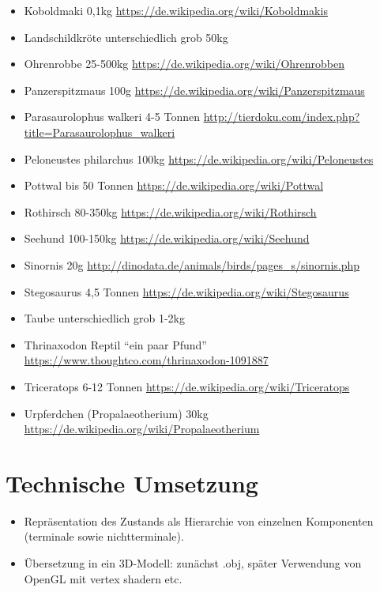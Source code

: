 \begin{itemize}
  \item Koboldmaki 0,1kg \url{https://de.wikipedia.org/wiki/Koboldmakis}
  \item Landschildkröte unterschiedlich grob 50kg
  \item Ohrenrobbe 25-500kg \url{https://de.wikipedia.org/wiki/Ohrenrobben}
  \item Panzerspitzmaus 100g \url{https://de.wikipedia.org/wiki/Panzerspitzmaus}
  \item Parasaurolophus walkeri 4-5 Tonnen \url{http://tierdoku.com/index.php?title=Parasaurolophus_walkeri}
  \item Peloneustes philarchus 100kg \url{https://de.wikipedia.org/wiki/Peloneustes}
  \item Pottwal bis 50 Tonnen \url{https://de.wikipedia.org/wiki/Pottwal}
  \item Rothirsch 80-350kg \url{https://de.wikipedia.org/wiki/Rothirsch}
  \item Seehund 100-150kg \url{https://de.wikipedia.org/wiki/Seehund}
  \item Sinornis 20g \url{http://dinodata.de/animals/birds/pages_s/sinornis.php}
  \item Stegosaurus 4,5 Tonnen \url{https://de.wikipedia.org/wiki/Stegosaurus}
  \item Taube unterschiedlich grob 1-2kg
  \item Thrinaxodon Reptil "`ein paar Pfund"' \url{https://www.thoughtco.com/thrinaxodon-1091887}
  \item Triceratops 6-12 Tonnen \url{https://de.wikipedia.org/wiki/Triceratops}
  \item Urpferdchen (Propalaeotherium) 30kg \url{https://de.wikipedia.org/wiki/Propalaeotherium}
 \end{itemize}

 
 
\chapter{Technische Umsetzung}

\begin{itemize}
 \item Repräsentation des Zustands als Hierarchie von einzelnen Komponenten (terminale sowie nichtterminale).
 \item Übersetzung in ein 3D-Modell: zunächst .obj, später Verwendung von OpenGL mit vertex shadern etc.\
\end{itemize}


